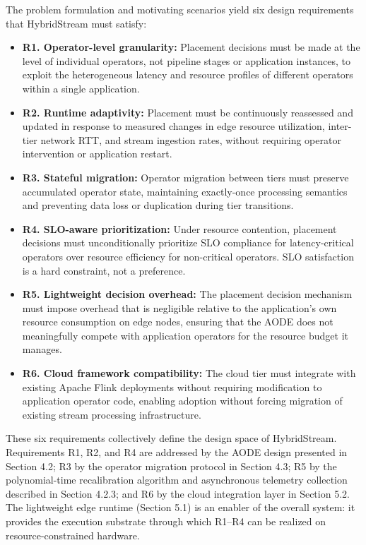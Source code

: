 \documentclass[preprint,review,12pt]{elsarticle}
\providecommand{\tightlist}{\setlength{\itemsep}{0pt}\setlength{\parskip}{0pt}}
\begin{document}
The problem formulation and motivating scenarios yield six design requirements that HybridStream must satisfy:

\begin{itemize}
\tightlist
\item
  \textbf{R1. Operator-level granularity:} Placement decisions must be made at the level of individual operators, not pipeline stages or application instances, to exploit the heterogeneous latency and resource profiles of different operators within a single application.
\item
  \textbf{R2. Runtime adaptivity:} Placement must be continuously reassessed and updated in response to measured changes in edge resource utilization, inter-tier network RTT, and stream ingestion rates, without requiring operator intervention or application restart.
\item
  \textbf{R3. Stateful migration:} Operator migration between tiers must preserve accumulated operator state, maintaining exactly-once processing semantics and preventing data loss or duplication during tier transitions.
\item
  \textbf{R4. SLO-aware prioritization:} Under resource contention, placement decisions must unconditionally prioritize SLO compliance for latency-critical operators over resource efficiency for non-critical operators. SLO satisfaction is a hard constraint, not a preference.
\item
  \textbf{R5. Lightweight decision overhead:} The placement decision mechanism must impose overhead that is negligible relative to the application's own resource consumption on edge nodes, ensuring that the AODE does not meaningfully compete with application operators for the resource budget it manages.
\item
  \textbf{R6. Cloud framework compatibility:} The cloud tier must integrate with existing Apache Flink deployments without requiring modification to application operator code, enabling adoption without forcing migration of existing stream processing infrastructure.
\end{itemize}

These six requirements collectively define the design space of HybridStream. Requirements R1, R2, and R4 are addressed by the AODE design presented in Section 4.2; R3 by the operator migration protocol in Section 4.3; R5 by the polynomial-time recalibration algorithm and asynchronous telemetry collection described in Section 4.2.3; and R6 by the cloud integration layer in Section 5.2. The lightweight edge runtime (Section 5.1) is an enabler of the overall system: it provides the execution substrate through which R1--R4 can be realized on resource-constrained hardware.
\end{document}
